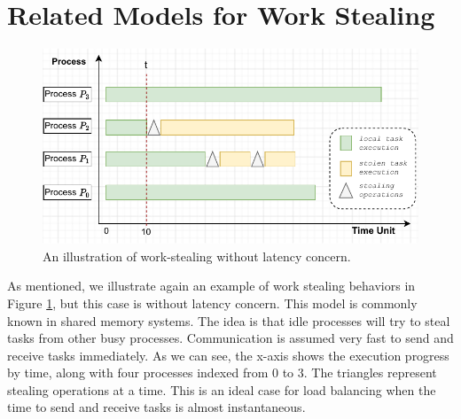 \section{Related Models for Work Stealing}
\label{sec:Refer-Model-WS}

\begin{figure}[t]
  \centering
  \includegraphics[scale=0.8]{./pictures/perf_analysis_model/perf_analysis_related_model_without_latency.pdf}
	\caption{An illustration of work-stealing without latency concern.}
	\label{fig:perfmodel_relatedmodelwithoutlatency}
\end{figure}

As mentioned, we illustrate again an example of work stealing behaviors in Figure \ref{fig:perfmodel_relatedmodelwithoutlatency}, but this case is without latency concern. This model is commonly known in shared memory systems. The idea is that idle processes will try to steal tasks from other busy processes. Communication is assumed very fast to send and receive tasks immediately. As we can see, the x-axis shows the execution progress by time, along with four processes indexed from 0 to 3. The triangles represent stealing operations at a time. This is an ideal case for load balancing when the time to send and receive tasks is almost instantaneous.\\

